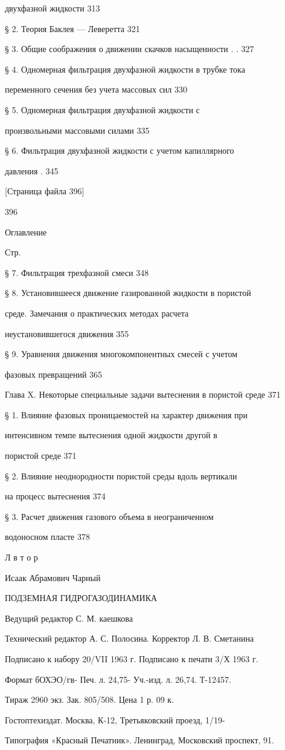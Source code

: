 \documentclass[
  11pt,
]{article}
\begin{document}
двухфазной жидкости 313 \par
§ 2. Теория Баклея --- Леверетта 321 \par
§ 3. Общие соображения о движении скачков насыщенности . . 327 \par
§ 4. Одномерная фильтрация двухфазной жидкости в трубке тока \par
переменного сечения без учета массовых сил 330 \par
§ 5. Одномерная фильтрация двухфазной жидкости с  \par
произвольными массовыми силами 335 \par
§ 6. Фильтрация двухфазной жидкости с учетом капиллярного \par
давления \textquotesingle. 345 \par
\smallskip
\smallskip
\smallskip
{[}Страница файла 396{]}\par
396 \par
Оглавление \par
Стр. \par
§ 7. Фильтрация трехфазной смеси 348 \par
§ 8. Установившееся движение газированной жидкости в пористой \par
среде. Замечания о практических методах расчета  \par
неустановившегося движения 355 \par
§ 9. Уравнения движения многокомпонентных смесей с учетом \par
фазовых превращений 365 \par
Глава X. Некоторые специальные задачи вытеснения в пористой среде 371 \par
§ 1. Влияние фазовых проницаемостей на характер движения при \par
интенсивном темпе вытеснения одной жидкости другой в  \par
пористой среде 371 \par
§ 2. Влияние неоднородности пористой среды вдоль вертикали \par
на процесс вытеснения 374 \par
§ 3. Расчет движения газового объема в неограниченном  \par
водоносном пласте 378 \par
Л в т о р \par
Исаак Абрамович Чарный \par
ПОДЗЕМНАЯ ГИДРОГАЗОДИНАМИКА \par
Ведущий редактор С. М. каешкова \par
Технический редактор А. С. Полосина. Корректор Л. В. Сметанина \par
Подписано к набору 20/VII 1963 г. Подписано к печати 3/Х 1963 г. \par
Формат бОХЭО\textquotesingle/гв- Печ. л. 24,75- Уч.-изд. л. 26,74. Т-12457. \par
Тираж 2960 экз. Зак. 805/508. Цена 1 р. 09 к. \par
Гостоптехиздат. Москва, К-12, Третьяковский проезд, 1/19- \par
Типография «Красный Печатник». Ленинград, Московский проспект, 91.\par
\endgroup
\end{document}
